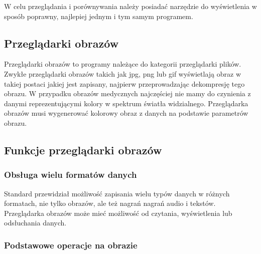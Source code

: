 
\par
W celu przeglądania i porównywania należy posiadać narzędzie do wyświetlenia w sposób poprawny, najlepiej jednym i tym samym programem.

\subsection{Przeglądarki obrazów}

Przeglądarki obrazów to programy należące do kategorii przeglądarki plików.
Zwykłe przeglądarki obrazów takich jak jpg, png lub gif wyświetlają obraz w takiej postaci jakiej jest zapisany, najpierw przeprowadzając dekompresję tego obrazu.
W przypadku obrazów medycznych najczęściej nie mamy do czynienia z danymi reprezentującymi kolory w spektrum światła widzialnego.
Przeglądarka obrazów \DICOM musi wygenerować kolorowy obraz z danych na podstawie parametrów obrazu.

\subsection{Funkcje przeglądarki obrazów}

\subsubsection{Obsługa wielu formatów danych}

Standard \DICOM przewidział możliwość zapisania wielu typów danych w różnych formatach, nie tylko obrazów, ale też nagrań nagrań audio i tekstów.
Przeglądarka obrazów \DICOM może mieć możliwość od czytania, wyświetlenia lub odsłuchania danych.

\subsubsection{Podstawowe operacje na obrazie}

